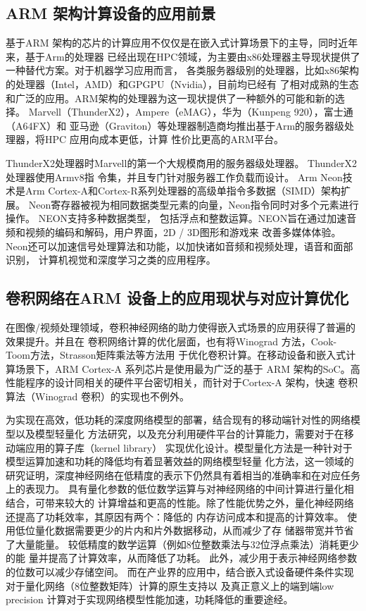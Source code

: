 \subsection{ARM 架构计算设备的应用前景}
基于ARM 架构的芯片的计算应用不仅仅是在嵌入式计算场景下的主导，同时近年来，基于Arm的处理器
已经出现在HPC领域，为主要由x86处理器主导现状提供了一种替代方案。对于机器学习应用而言，
各类服务器级别的处理器，比如x86架构的处理器（Intel，AMD）和GPGPU（Nvidia），目前均已经有
了相对成熟的生态和广泛的应用。ARM架构的处理器为这一现状提供了一种额外的可能和新的选择。
Marvell（ThunderX2），Ampere（eMAG），华为（Kunpeng 920），富士通（A64FX）和
亚马逊（Graviton）等处理器制造商均推出基于Arm的服务器级处理器，将HPC 应用向成本更低，计算
性价比更高的ARM平台。

ThunderX2处理器时Marvell的第一个大规模商用的服务器级处理器。 ThunderX2处理器使用Armv8指
令集，并且专门针对服务器工作负载而设计。 Arm Neon技术是Arm Cortex-A和Cortex-R系列处理器的高级单指令多数据（SIMD）架构扩展。
Neon寄存器被视为相同数据类型元素的向量，Neon指令同时对多个元素进行操作。 NEON支持多种数据类型，
包括浮点和整数运算。NEON旨在通过加速音频和视频的编码和解码，用户界面，2D / 3D图形和游戏来
改善多媒体体验。 Neon还可以加速信号处理算法和功能，以加快诸如音频和视频处理，语音和面部识别，
计算机视觉和深度学习之类的应用程序。

\subsection{卷积网络在ARM 设备上的应用现状与对应计算优化}

在图像/视频处理领域，卷积神经网络的助力使得嵌入式场景的应用获得了普遍的效果提升。并且在
卷积网络计算的优化层面，也有将Winograd 方法，Cook-Toom方法，Strasson矩阵乘法等方法用
于优化卷积计算。在移动设备和嵌入式计算场景下，ARM Cortex-A 系列芯片是使用最为广泛的基于
ARM  架构的SoC。高性能程序的设计同相关的硬件平台密切相关，而针对于Cortex-A 架构，快速
卷积算法（Winograd 卷积）的实现也不例外。

为实现在高效，低功耗的深度网络模型的部署，结合现有的移动端针对性的网络模型以及模型轻量化
方法研究，以及充分利用硬件平台的计算能力，需要对于在移动端应用的算子库（kernel library）
实现优化设计。模型量化方法是一种针对于模型运算加速和功耗的降低均有着显著效益的网络模型轻量
化方法，这一领域的研究证明，深度神经网络在低精度的表示下仍然具有着相当的准确率和在对应任务
上的表现力。 具有量化参数的低位数学运算与对神经网络的中间计算进行量化相结合，可带来较大的
计算增益和更高的性能。除了性能优势之外，量化神经网络还提高了功耗效率，其原因有两个：降低的
内存访问成本和提高的计算效率。 使用低位量化数据需要更少的片内和片外数据移动，从而减少了存
储器带宽并节省了大量能量。 较低精度的数学运算（例如8位整数乘法与32位浮点乘法）消耗更少的能
量并提高了计算效率，从而降低了功耗。 此外，减少用于表示神经网络参数的位数可以减少存储空间。
而在产业界的应用中，结合嵌入式设备硬件条件实现对于量化网络（8位整数矩阵）计算的原生支持以
及真正意义上的端到端low precision 计算对于实现网络模型性能加速，功耗降低的重要途经。

